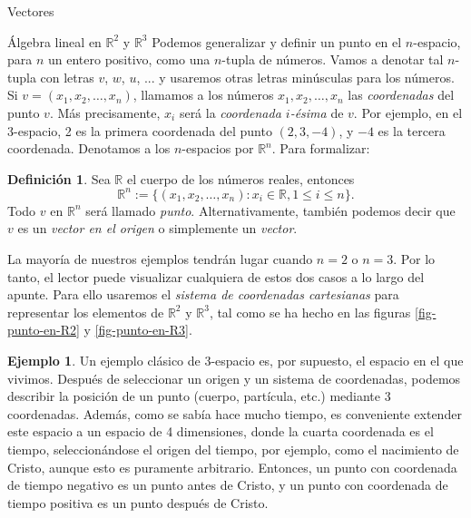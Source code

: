 \documentclass[a4paper,12pt,twoside,spanish,reqno]{amsbook}
\theoremstyle{definition}
\newtheorem{definicion}{Definici\'on}[section]
\newtheorem{ejemplo}{Ejemplo}[section]
\theoremstyle{remark}
\newcommand{\R}{\mathbb R}
\begin{document}
\begin{chapter}{Vectores}
\begin{section}{Álgebra lineal en $\R^2$ y $\R^3$}
		Podemos generalizar y definir un punto en el $n$-espacio, para $n$ un entero positivo, como una $n$-tupla de números. Vamos a denotar tal $n$-tupla con letras $v$, $w$, $u$, ... y usaremos otras letras minúsculas para los números. Si $v =(x_1,x_2,\ldots,x_n)$, llamamos a los números $x_1,x_2,\ldots,x_n$ las \textit{coordenadas} del punto $v$. Más precisamente, $x_i$ será la \textit{coordenada $i$-ésima} de $v$. Por ejemplo, en el 3-espacio, 2 es la primera coordenada del punto $(2,3, -4)$, y $-4$ es la tercera coordenada. Denotamos a los  $n$-espacios por $\R^n$. Para formalizar:
		\begin{definicion}
			Sea $\R$ el cuerpo de los números reales,  entonces
			\begin{equation*}
				\R^n:= \{(x_1,x_2,\ldots,x_n): x_i \in \R, 1 \le i \le n \}.
			\end{equation*}
			Todo $v$ en $\R^n$ será llamado {\em punto}. Alternativamente, también podemos decir que $v$  es un \textit{vector en el origen} o simplemente un \textit{vector}. 

		\end{definicion}
		
		La mayoría de nuestros ejemplos tendrán lugar cuando $n = 2$ o $n = 3$. Por lo tanto, el lector puede visualizar cualquiera de estos dos casos a lo largo del apunte. Para ello usaremos el {\em sistema  de coordenadas cartesianas} para representar los elementos de  $\R^2$ y  $\R^3$, tal como se ha hecho en las figuras \ref{fig-punto-en-R2} y \ref{fig-punto-en-R3}.
		
	
	
		\begin{ejemplo} \label{ej-3espacio-industria}
			Un ejemplo clásico de 3-espacio es, por supuesto, el espacio en el que vivimos. Después de seleccionar un origen y un sistema de coordenadas, podemos describir la posición de un punto (cuerpo, partícula, etc.) mediante 3 coordenadas. Además, como se sabía hace mucho tiempo, es conveniente extender este espacio a un espacio de 4 dimensiones, donde la cuarta coordenada es el tiempo, seleccionándose el origen del tiempo, por ejemplo, como el nacimiento de Cristo, aunque esto es puramente arbitrario. Entonces, un punto con coordenada de tiempo negativo es un punto antes de Cristo, y un punto con coordenada  de tiempo positiva es un punto después de Cristo.
			

\end{ejemplo}
\end{section}
\end{chapter}
\end{document}
